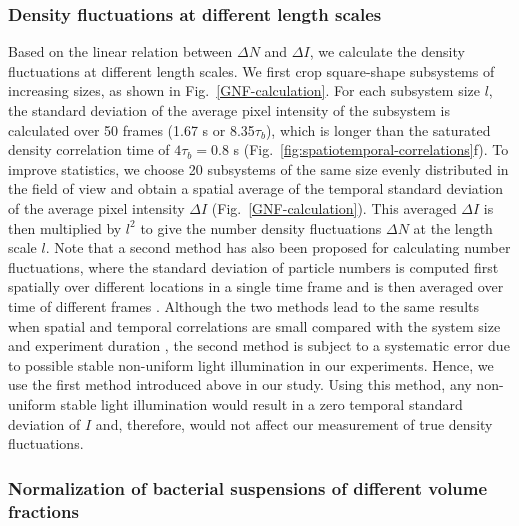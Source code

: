 \documentclass[twocolumn,aps,prx,amsmath,amssymb,longbibliography]{revtex4-2}
\begin{document}
\subsubsection{Density fluctuations at different length scales}

Based on the linear relation between $\Delta N$ and $\Delta I$, we calculate the density fluctuations at different length scales. We first crop square-shape subsystems of increasing sizes, as shown in Fig.~\ref{GNF-calculation}. For each subsystem size $l$, the standard deviation of the average pixel intensity of the subsystem is calculated over 50 frames (1.67 s or 8.35$\tau_b$), which is longer than the saturated density correlation time of $4\tau_b = 0.8$ s (Fig.~\ref{fig:spatiotemporal-correlations}f). To improve statistics, we choose 20 subsystems of the same size evenly distributed in the field of view and obtain a spatial average of the temporal standard deviation of the average pixel intensity $\Delta I$ (Fig.~\ref{GNF-calculation}). This averaged $\Delta I$ is then multiplied by $l^2$ to give the number density fluctuations $\Delta N$ at the length scale $l$. Note that a second method has also been proposed for calculating number fluctuations, where the standard deviation of particle numbers is computed first spatially over different locations in a single time frame and is then averaged over time of different frames \cite{Aranson2008}. Although the two methods lead to the same results when spatial and temporal correlations are small compared with the system size and experiment duration \cite{Aranson2008}, the second method is subject to a systematic error due to possible stable non-uniform light illumination in our experiments. Hence, we use the first method introduced above in our study. Using this method, any non-uniform stable light illumination would result in a zero temporal standard deviation of $I$ and, therefore, would not affect our measurement of true density fluctuations.


\subsubsection{Normalization of bacterial suspensions of different volume fractions}
\end{document}
